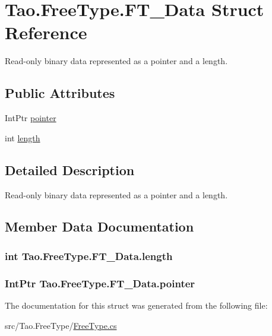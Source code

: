 \hypertarget{struct_tao_1_1_free_type_1_1_f_t___data}{
\section{Tao.FreeType.FT\_\-Data Struct Reference}
\label{struct_tao_1_1_free_type_1_1_f_t___data}
}


Read-\/only binary data represented as a pointer and a length.  


\subsection*{Public Attributes}
\begin{DoxyCompactItemize}
\item 
IntPtr \hyperlink{struct_tao_1_1_free_type_1_1_f_t___data_a6a4863b8339fd7b47efad34a65bea8f9}{pointer}
\item 
int \hyperlink{struct_tao_1_1_free_type_1_1_f_t___data_acd3ab4b065bdd02f71fb2fb6d4bcb2ea}{length}
\end{DoxyCompactItemize}


\subsection{Detailed Description}
Read-\/only binary data represented as a pointer and a length. 

\subsection{Member Data Documentation}
\hypertarget{struct_tao_1_1_free_type_1_1_f_t___data_acd3ab4b065bdd02f71fb2fb6d4bcb2ea}{
\subsubsection[{length}]{\setlength{\rightskip}{0pt plus 5cm}int {\bf Tao.FreeType.FT\_\-Data.length}}}
\label{struct_tao_1_1_free_type_1_1_f_t___data_acd3ab4b065bdd02f71fb2fb6d4bcb2ea}
\hypertarget{struct_tao_1_1_free_type_1_1_f_t___data_a6a4863b8339fd7b47efad34a65bea8f9}{
\subsubsection[{pointer}]{\setlength{\rightskip}{0pt plus 5cm}IntPtr {\bf Tao.FreeType.FT\_\-Data.pointer}}}
\label{struct_tao_1_1_free_type_1_1_f_t___data_a6a4863b8339fd7b47efad34a65bea8f9}


The documentation for this struct was generated from the following file:\begin{DoxyCompactItemize}
\item 
src/Tao.FreeType/\hyperlink{_free_type_8cs}{FreeType.cs}\end{DoxyCompactItemize}
